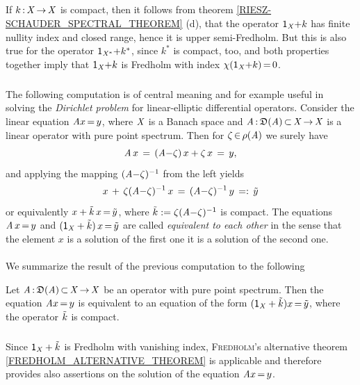 \documentclass[11pt,twoside]{article}
\begin{document}
\subparagraph{} %
If $k {\,:\,} \mathit{X} {\,\to\,} \mathit{X}$ is compact,
then it follows from theorem \ref{RIESZ-SCHAUDER_SPECTRAL_THEOREM} (d),
that the operator ${\mathsf{1}}_{\mathit{X}}{+}k$ has finite nullity index and closed range,
hence it is upper semi-Fredholm.
But this is also true for the operator ${\mathsf{1}}_{\mathit{X}^*}{+}k^*$,
since $k^*$ is compact, too,
and both properties together imply that ${\mathsf{1}}_{\mathit{X}}{+}k$ is Fredholm with
index $\chi({\mathsf{1}}_{\mathit{X}}{+}k) {\,=\,} 0$.

\subparagraph{} %
The following computation is of central meaning 
and for example useful in solving the \textit{Dirichlet problem}
for linear-elliptic differential operators.
Consider the linear equation $\mathit{A} x {\,=\,} y$,
where $\mathit{X}$ is a Banach space and
$\mathit{A} {\,:\,} \mathfrak{D}(\mathit{A}) {\,\subset\,} \mathit{X} {\,\to\,} \mathit{X}$
is a linear operator with pure point spectrum.
Then for $\zeta {\,\in\,} \rho(\mathit{A})$ we surely have
\[
\mathit{A} \,x \,=\, (\mathit{A} {-}\zeta)\,x + \zeta \,x \,=\, y,
\]
and applying the mapping $(\mathit{A} {-}\zeta)^{-1}$ from the left yields
\[
x \,+\, \zeta (\mathit{A} {-} \zeta)^{-1}\,x
\,=\,
(\mathit{A} {-}\zeta)^{-1}\,y \, =: \, \tilde{y}
\]
or equivalently $x + \tilde{k} \,x {\,=\,} \tilde{y}$,
where $\tilde{k} := \zeta (\mathit{A} {-} \zeta)^{-1}$ is compact.
The equations $\mathit{A} \,x {\,=\,} y$ and
$({\mathsf{1}}_{\mathit{X}} + \tilde{k})\,x {\,=\,} \tilde{y}$
are called \textit{equivalent to each other} in the sense
that the element $x$ is a solution of the first one
\iff
it is a solution of the second one.

\paragraph{}
We summarize the result of the previous computation to the following

\begin{theorem}\label{FREDHOLM_ALTERNATIVE_THEOREM_II}
Let $\mathit{A} {\,:\,} \mathfrak{D}(\mathit{A}) {\,\subset\,} \mathit{X} {\,\to\,} \mathit{X}$
be an operator with pure point spectrum.
Then the equation $\mathit{A} x {\,=\,} y$ is equivalent to an equation
of the form $({\mathsf{1}}_{\mathit{X}} + \tilde{k})x {\,=\,} \tilde{y}$,
where the operator $\tilde{k}$ is compact.
\end{theorem}

\subparagraph{}
Since ${\mathsf{1}}_{\mathit{X}} + \tilde{k}$ is Fredholm with vanishing index,
\textsc{Fredholm}'s alternative theorem \ref{FREDHOLM_ALTERNATIVE_THEOREM}
is applicable and therefore provides also assertions
on the solution of the equation $\mathit{A} x {\,=\,} y$.
\end{document}
